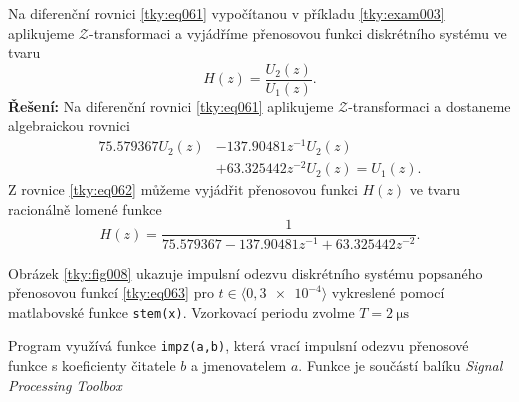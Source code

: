 \begin{mdframed}[style=mdexam]
  \begin{example}\label{tky:exam004}
    Na diferenční rovnici \ref{tky:eq061} vypočítanou v příkladu \ref{tky:exam003} aplikujeme
    \(\mathcal{Z}\)-transformaci a vyjádříme přenosovou funkci diskrétního systému ve tvaru
    \begin{equation*}
      H(z) = \dfrac{U_2(z)}{U_1(z)}.
    \end{equation*}
    \noindent\textbf{Řešení:}
    Na diferenční rovnici \ref{tky:eq061} aplikujeme \(\mathcal{Z}\)-transformaci a dostaneme
    algebraickou rovnici
    \begin{align}
      \num{75.579367}U_2(z) &- \num{137.90481}z^{-1}U_2(z)                       \nonumber \\
                            &+ \num{63.325442}z^{-2}U_2(z) = U_1(z).             \label{tky:eq062}
    \end{align}
    Z rovnice \ref{tky:eq062} můžeme vyjádřit přenosovou funkci \(H(z)\) ve tvaru racionálně lomené
    funkce
    \begin{equation}\label{tky:eq063}
      H(z) = \dfrac{1}{\num{75.579367}-\num{137.90481}z^{-1}+\num{63.325442}z^{-2}}.
    \end{equation}
    
    {\centering
      \captionsetup{type=figure}
      \label{tky:fig008}
    \par}
    Obrázek \ref{tky:fig008} ukazuje impulsní odezvu diskrétního systému popsaného přenosovou funkcí
    \ref{tky:eq063} pro \(t\in\langle0,\num{3e-4}\rangle\) vykreslené pomocí matlabovské funkce
    \lstinline[style=luaMatlabText]!stem(x)!. Vzorkovací periodu zvolme \(T = \SI{2}{\us}\)

    Program využívá funkce \lstinline[style=luaMatlabText]!impz(a,b)!, která vrací impulsní odezvu
    přenosové funkce s koeficienty čitatele \(b\) a jmenovatelem \(a\). Funkce je součástí balíku 
    \emph{Signal Processing Toolbox}    
  \end{example} 

  
\end{mdframed}